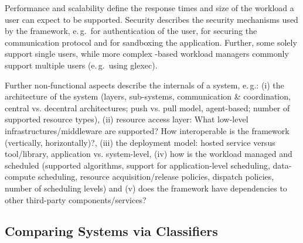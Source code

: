 \documentclass{sig-alternate}
\begin{document}

 Performance and scalability define the
response times and size of the workload a user can expect to be
supported.  Security describes the security mechanisms used by the
framework, e.\,g.\ for authentication of the user, for securing the
communication protocol and for sandboxing the application.  Further,
some \pilotjobs solely support single users, while more complex
\pilot-based workload managers commonly support multiple users
(e.\,g.\ using glexec).

Further non-functional aspects describe the internals of a \pilotjob system,
e.\,g.: (i) the architecture of the system (layers, sub-systems,
communication \& coordination, central vs. decentral architectures; push vs.
pull model, agent-based; number of supported resource types), (ii) resource
access layer: What low-level infrastructures/middleware are supported? How
interoperable is the framework (vertically, horizontally)?, (iii) the
deployment model: hosted service versus tool/library, application vs.
system-level, (iv) how is the workload managed and scheduled (supported
algorithms, support for application-level scheduling, data-compute scheduling,
resource acquisition/release policies, dispatch policies, number of scheduling
levels) and (v) does the framework have dependencies to other third-party
components/services?

\subsection{Comparing \pilot Systems via Classifiers}

\end{document}
